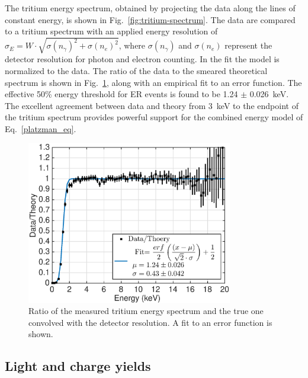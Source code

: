 The tritium energy spectrum, obtained by projecting the data along the lines of constant energy, is shown in Fig.~\ref{fig:tritium-spectrum}. The data are compared to a tritium spectrum with an applied energy resolution of $ \sigma_E = W \cdot \sqrt{\sigma(n_{\gamma})^2 + \sigma(n_e)^2}$, where $ \sigma(n_{\gamma})$ and $ \sigma(n_e)$ represent the detector resolution for photon and electron counting. In the fit the model is normalized to the data. The ratio of the data to the smeared theoretical spectrum is shown in Fig.~\ref{fig:ER-threshold}, along with an empirical fit to an error function. The effective 50\% energy threshold for ER events is found to be 1.24 $\pm$ 0.026~keV. The excellent agreement between data and theory from 3~keV to the endpoint of the tritium spectrum provides powerful support for the combined energy model of Eq.~\ref{platzman_eq}.

\begin{figure}[t!]
\includegraphics[width=90mm]{fig/fig6.eps}
\caption{Ratio of the measured tritium energy spectrum and the true one convolved with the detector resolution. A fit to an error function is shown.}
\label{fig:ER-threshold}
\end{figure}

\subsection{Light and charge yields}

